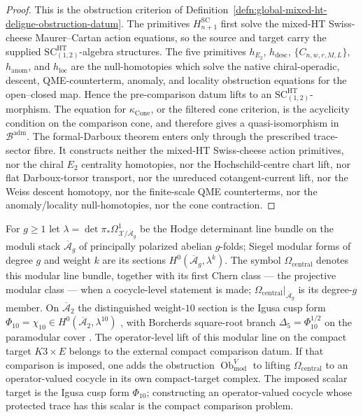 \documentclass[11pt]{memoir}
\begin{document}
\begin{proof}
  This is the obstruction criterion of
  Definition~\ref{defn:global-mixed-ht-deligne-obstruction-datum}.  The
  primitives \(H^{\mathrm{SC}}_{n+1}\) first solve the mixed-HT
  Swiss-cheese Maurer--Cartan action equations, so the source and
  target carry the supplied
  \(\mathrm{SC}^{\mathrm{HT}}_{(1,2)}\)-algebra structures.  The five
	  primitives \(h_{E_2}\), \(h_{\mathrm{desc}}\), \(\{C_{n,w,r,M,L}\}\),
  \(h_{\mathrm{anom}}\), and \(h_{\mathrm{loc}}\) are the
	  null-homotopies which solve the native chiral-operadic, descent,
	  QME-counterterm, anomaly, and locality obstruction equations for the open--closed map.
  Hence the pre-comparison datum lifts to an
  \(\mathrm{SC}^{\mathrm{HT}}_{(1,2)}\)-morphism.  The equation for
  \(\kappa_{\operatorname{Cone}}\), or the filtered cone criterion, is
  the acyclicity condition on the comparison cone, and therefore gives a
  quasi-isomorphism in \(\mathcal B^{\mathrm{adm}}\).
  The formal-Darboux theorem enters only through the prescribed
  trace-sector fibre.  It constructs neither the mixed-HT Swiss-cheese
  action primitives, nor the chiral \(E_2\) centrality homotopies, nor
  the Hochschild-centre chart lift, nor flat Darboux-torsor transport,
  nor the unreduced cotangent-current lift, nor the Weiss descent
  homotopy, nor the finite-scale QME counterterms, nor the
  anomaly/locality null-homotopies, nor the cone contraction.
\end{proof}

\begin{rmk}
\label{rmk:omega-central-definition}
For \(g\geq1\) let
\(\lambda=\det\pi_*\Omega^1_{\mathcal X/\overline{\mathcal A}_g}\) be
the Hodge determinant line bundle on the moduli stack
\(\overline{\mathcal A}_g\) of principally polarized abelian
\(g\)-folds; Siegel modular forms of degree \(g\) and weight \(k\) are
its sections \(H^0(\overline{\mathcal A}_g,\lambda^{k})\).  The symbol
\(\Omega_{\mathrm{central}}\) denotes this modular line bundle,
together with its first Chern class --- the projective modular class
--- when a cocycle-level statement is made;
\(\Omega_{\mathrm{central}}\bigl|_{\overline{\mathcal A}_g}\) is its
degree-\(g\) member.  On
\(\overline{\mathcal A}_2\) the distinguished weight-\(10\) section is
the Igusa cusp form
\(\Phi_{10}=\chi_{10}\in H^0(\overline{\mathcal A}_2,\lambda^{10})\)
\cite{igusa-cusp-form}, with Borcherds square-root branch
\(\Delta_5=\Phi_{10}^{1/2}\) on the paramodular cover
\cite{gritsenko-nikulin-paramodular}.
The operator-level lift of this modular line on the compact target
\(K3\times E\) belongs to the external compact comparison datum.  If that
comparison is imposed, one adds the
obstruction \(\operatorname{Ob}^V_{\mathrm{mod}}\) to lifting
\(\Omega_{\mathrm{central}}\) to an operator-valued cocycle in its own
compact-target complex.  The imposed scalar target is the Igusa cusp
form \(\Phi_{10}\); constructing an operator-valued cocycle
whose protected trace has this scalar is the compact comparison problem.
\end{rmk}
\end{document}
